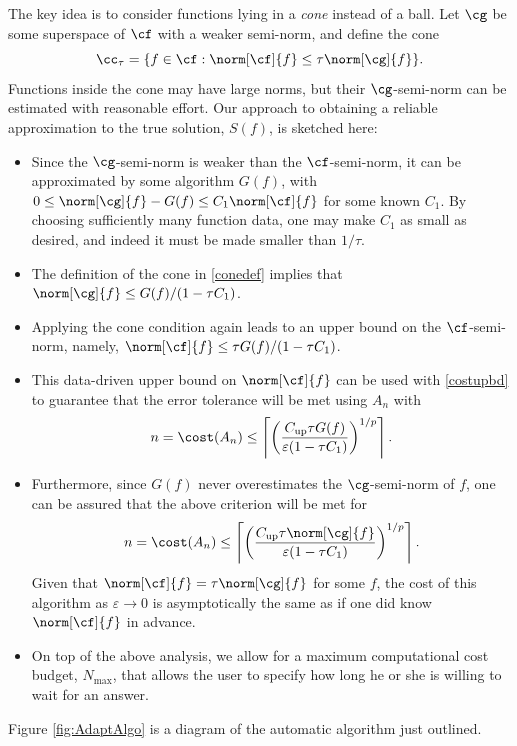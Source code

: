 \documentclass[]{elsarticle}
\DeclareMathOperator{\up}{up}
\theoremstyle{definition}
\theoremstyle{remark}
\begin{document}
The key idea is to consider functions lying in a \emph{cone} instead of a ball.  Let $\cg$ be some superspace of $\cf$ with a weaker semi-norm, and define the cone
\begin{equation} \label{conedef}
\cc_{\tau}=\{f \in \cf : \norm[\cf]{f} \le \tau \norm[\cg]{f} \}.
\end{equation}
Functions inside the cone may have large norms, but their $\cg$-semi-norm can be estimated with reasonable effort.  Our approach to obtaining a reliable approximation to the true solution, $S(f)$, is sketched here:

\begin{itemize}
\item Since the $\cg$-semi-norm is weaker than the $\cf$-semi-norm, it can be approximated by some algorithm $G(f)$, with $0\le \norm[\cg]{f}-G(f) \le C_1\norm[\cf]{f}$ for some known $C_1$.  By choosing sufficiently many function data, one may make $C_1$ as small as desired, and indeed it must be made smaller than $1/\tau$.

\item The definition of the cone in \eqref{conedef} implies that $\norm[\cg]{f} \le G(f)/(1 - \tau C_1)$.

\item Applying the cone condition again leads to an upper bound on the $\cf$-semi-norm, namely,  $\norm[\cf]{f} \le \tau G(f)/(1 - \tau C_1)$.

\item This data-driven upper bound on $\norm[\cf]{f}$ can be used with \eqref{costupbd} to guarantee that the error tolerance will be met using $A_n$ with
\[
n=\cost(A_n)\le \left \lceil\left(\frac{ C_{\up}\tau G(f)}{\varepsilon(1 - \tau C_1)}\right)^{1/p} \right \rceil.
\]

\item Furthermore, since $G(f)$ never overestimates the $\cg$-semi-norm of $f$, one can be assured that the above criterion will be met for 
\[
n=\cost(A_n)\le \left \lceil\left(\frac{ C_{\up}\tau \norm[\cg]{f}}{\varepsilon(1 - \tau C_1)}\right)^{1/p} \right \rceil.
\]
Given that $\norm[\cf]{f} = \tau \norm[\cg]{f}$ for some $f$, the cost of this algorithm as $\varepsilon \to 0$ is asymptotically the same as if one did know $\norm[\cf]{f}$ in advance.

\item On top of the above analysis, we allow for a maximum computational cost budget, $N_{\max}$, that allows the user to specify how long he or she is willing to wait for an answer.

\end{itemize} 
Figure \ref{fig:AdaptAlgo} is a diagram of the automatic algorithm just outlined.
\end{document}
